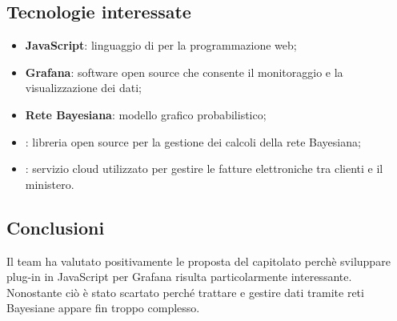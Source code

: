 \subsection{Tecnologie interessate}
\begin{itemize}
    \item \textbf{JavaScript}: linguaggio di  per la programmazione web;\phantom{.}
    \item \textbf{Grafana}: software open source che consente il monitoraggio e la visualizzazione dei dati;\phantom{.}
    \item \textbf{Rete Bayesiana}: modello grafico probabilistico;\phantom{.}
    \item \textbf{}: libreria open source per la gestione dei calcoli della rete Bayesiana;\phantom{.}
    \item \textbf{}: servizio cloud utilizzato per gestire le fatture elettroniche tra clienti e il ministero.
\end{itemize}   

\subsection{Conclusioni}
Il team ha valutato positivamente le proposta del capitolato perchè sviluppare plug-in in JavaScript per Grafana risulta particolarmente interessante. Nonostante ciò è stato scartato perché trattare e gestire dati tramite reti Bayesiane appare fin troppo complesso.
